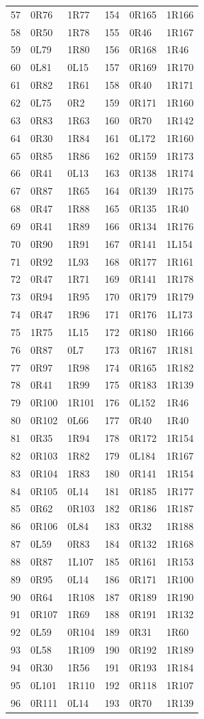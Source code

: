 \begin{longtable}{rll@{\qquad}rll}
57 & 0R76 & 1R77 & 154 & 0R165 & 1R166\\
58 & 0R50 & 1R78 & 155 & 0R46 & 1R167\\
59 & 0L79 & 1R80 & 156 & 0R168 & 1R46\\
60 & 0L81 & 0L15 & 157 & 0R169 & 1R170\\
61 & 0R82 & 1R61 & 158 & 0R40 & 1R171\\
62 & 0L75 & 0R2 & 159 & 0R171 & 1R160\\
63 & 0R83 & 1R63 & 160 & 0R70 & 1R142\\
64 & 0R30 & 1R84 & 161 & 0L172 & 1R160\\
65 & 0R85 & 1R86 & 162 & 0R159 & 1R173\\
66 & 0R41 & 0L13 & 163 & 0R138 & 1R174\\
67 & 0R87 & 1R65 & 164 & 0R139 & 1R175\\
68 & 0R47 & 1R88 & 165 & 0R135 & 1R40\\
69 & 0R41 & 1R89 & 166 & 0R134 & 1R176\\
70 & 0R90 & 1R91 & 167 & 0R141 & 1L154\\
71 & 0R92 & 1L93 & 168 & 0R177 & 1R161\\
72 & 0R47 & 1R71 & 169 & 0R141 & 1R178\\
73 & 0R94 & 1R95 & 170 & 0R179 & 1R179\\
74 & 0R47 & 1R96 & 171 & 0R176 & 1L173\\
75 & 1R75 & 1L15 & 172 & 0R180 & 1R166\\
76 & 0R87 & 0L7 & 173 & 0R167 & 1R181\\
77 & 0R97 & 1R98 & 174 & 0R165 & 1R182\\
78 & 0R41 & 1R99 & 175 & 0R183 & 1R139\\
79 & 0R100 & 1R101 & 176 & 0L152 & 1R46\\
80 & 0R102 & 0L66 & 177 & 0R40 & 1R40\\
81 & 0R35 & 1R94 & 178 & 0R172 & 1R154\\
82 & 0R103 & 1R82 & 179 & 0L184 & 1R167\\
83 & 0R104 & 1R83 & 180 & 0R141 & 1R154\\
84 & 0R105 & 0L14 & 181 & 0R185 & 1R177\\
85 & 0R62 & 0R103 & 182 & 0R186 & 1R187\\
86 & 0R106 & 0L84 & 183 & 0R32 & 1R188\\
87 & 0L59 & 0R83 & 184 & 0R132 & 1R168\\
88 & 0R87 & 1L107 & 185 & 0R161 & 1R153\\
89 & 0R95 & 0L14 & 186 & 0R171 & 1R100\\
90 & 0R64 & 1R108 & 187 & 0R189 & 1R190\\
91 & 0R107 & 1R69 & 188 & 0R191 & 1R132\\
92 & 0L59 & 0R104 & 189 & 0R31 & 1R60\\
93 & 0L58 & 1R109 & 190 & 0R192 & 1R189\\
94 & 0R30 & 1R56 & 191 & 0R193 & 1R184\\
95 & 0L101 & 1R110 & 192 & 0R118 & 1R107\\
96 & 0R111 & 0L14 & 193 & 0R70 & 1R139\\
\end{longtable}\endgroup

